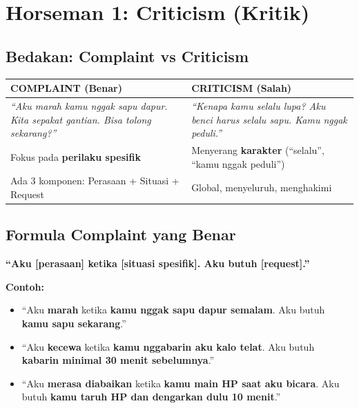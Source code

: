 \section{Horseman 1: Criticism (Kritik)}

\subsection{Bedakan: Complaint vs Criticism}

\begin{center}
\renewcommand{\arraystretch}{1.5}
\begin{tabular}{|>{\raggedright}p{6cm}|>{\raggedright\arraybackslash}p{9cm}|}
\hline
\rowcolor{sagegreen!20}
\textbf{COMPLAINT (Benar)} & \textbf{CRITICISM (Salah)} \\
\hline
\textit{``Aku marah kamu nggak sapu dapur. Kita sepakat gantian. Bisa tolong sekarang?''} & \textit{``Kenapa kamu selalu lupa? Aku benci harus selalu sapu. Kamu nggak peduli.''} \\
\hline
Fokus pada \textbf{perilaku spesifik} & Menyerang \textbf{karakter} (``selalu'', ``kamu nggak peduli'') \\
\hline
Ada 3 komponen: Perasaan + Situasi + Request & Global, menyeluruh, menghakimi \\
\hline
\end{tabular}
\end{center}

\subsection{Formula Complaint yang Benar}

\begin{praktikbox}
\textbf{``Aku [perasaan] ketika [situasi spesifik]. Aku butuh [request].''}

\textbf{Contoh:}
\begin{itemize}
    \item ``Aku \textbf{marah} ketika \textbf{kamu nggak sapu dapur semalam}. Aku butuh \textbf{kamu sapu sekarang}.''
    \item ``Aku \textbf{kecewa} ketika \textbf{kamu nggabarin aku kalo telat}. Aku butuh \textbf{kabarin minimal 30 menit sebelumnya}.''
    \item ``Aku \textbf{merasa diabaikan} ketika \textbf{kamu main HP saat aku bicara}. Aku butuh \textbf{kamu taruh HP dan dengarkan dulu 10 menit}.''
\end{itemize}
\end{praktikbox}

